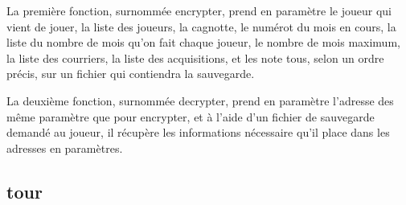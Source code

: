 \documentclass[a4paper, 11pt]{report}
\begin{document}
La première fonction, surnommée encrypter, prend en paramètre le joueur qui vient de jouer, la liste des joueurs, la cagnotte, le numérot du mois en cours, la liste du nombre de mois qu'on fait chaque joueur, le nombre de mois maximum, la liste des courriers, la liste des acquisitions, et les note tous, selon un ordre précis, sur un fichier qui contiendra la sauvegarde.

La deuxième fonction, surnommée decrypter, prend en paramètre l'adresse des même paramètre que pour encrypter, et à l'aide d'un fichier de sauvegarde demandé au joueur, il récupère les informations nécessaire qu'il place dans les adresses en paramètres.


\subsection{tour}
\end{document}
